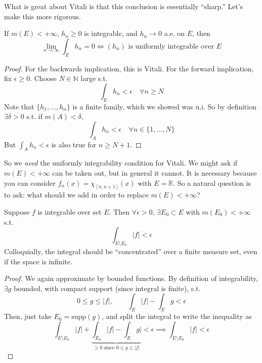   What is great about Vitali is that this conclusion is essentially ``sharp.'' Let's make this more rigorous. 

  \begin{theorem}
    If $m(E) < +\infty$, $h_n \geq 0$ is integrable, and $h_n \to 0$ a.e. on $E$, then 
    \begin{equation}
      \lim_{n \to \infty} \int_E h_n = 0 \iff (h_n) \text{ is uniformly integrable over } E
    \end{equation}
  \end{theorem}
  \begin{proof}
    For the backwards implication, this is Vitali. For the forward implication, fix $\epsilon \geq 0$. Choose $N \in \mathbb{N}$ large s.t. 
    \begin{equation}
      \int_E h_n < \epsilon \quad \forall n \geq N
    \end{equation}
    Note that $\{h_1, \ldots, h_n\}$ is a finite family, which we showed was u.i. So by definition $\exists \delta > 0$ s.t. if $m(A) < \delta$, 
    \begin{equation}
      \int_A h_n < \epsilon \quad \forall n \in \{1, \ldots, N\} 
    \end{equation}
    But $\int_A h_n < \epsilon$ is also true for $n \geq N +1$. 
  \end{proof}

  So we \textit{need} the uniformly integrability condition for Vitali. We might ask if $m(E) < +\infty$ can be taken out, but in general it cannot. It is necessary because you can consider $f_n(x) = \chi_{[n, n+1]} (x)$ with $E = \mathbb{R}$. So a natural question is to ask: what should we add in order to replace $m(E) < +\infty$? 

  \begin{lemma}
    Suppose $f$ is integrable over set $E$. Then $\forall \epsilon > 0$, $\exists E_0 \subset E$ with $m(E_0) < +\infty$ s.t. 
    \begin{equation}
      \int_{E \setminus E_0} |f| < \epsilon
    \end{equation}
    Colloquially, the integral should be ``concentrated'' over a finite measure set, even if the space is infinite. 
  \end{lemma}
  \begin{proof}
    We again approximate by bounded functions. By definition of integrability, $\exists g$ bounded, with compact support (since integral is finite), s.t. 
    \begin{equation}
      0 \leq g \leq |f|, \qquad \int_E |f| - \int_E g < \epsilon
    \end{equation}
    Then, just take $E_0 = \mathrm{supp}(g)$, and split the integral to write the inequality as 
    \begin{equation}
      \int_{E \setminus E_0} |f| + \underbrace{\int_{E_0} |f|  - \int_E g|}_{\geq 0 \text{ since } 0 \leq g \leq |f|} < \epsilon \implies  \int_{E \setminus E_0} |f| < \epsilon
    \end{equation}
  \end{proof}

